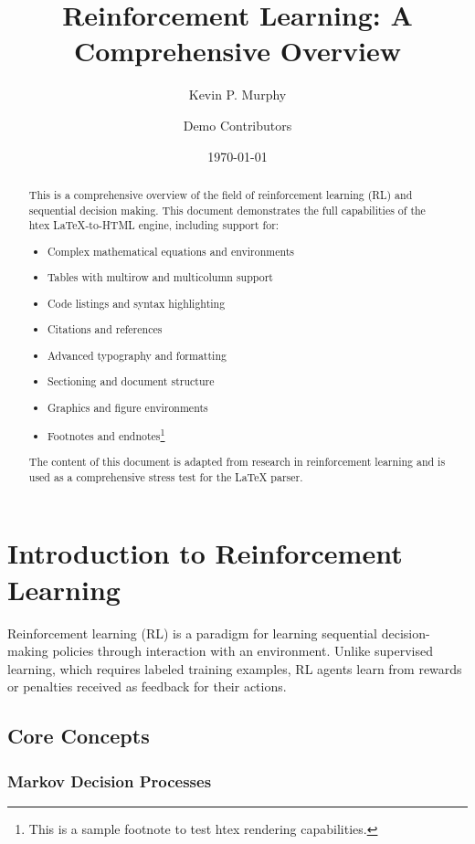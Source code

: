 \documentclass[10pt]{article}
\title{Reinforcement Learning: A Comprehensive Overview}
\author{Kevin P. Murphy \and Demo Contributors}
\date{\today}
\begin{document}
\maketitle

\begin{abstract}
This is a comprehensive overview of the field of reinforcement learning (RL) and sequential decision making. This document demonstrates the full capabilities of the htex LaTeX-to-HTML engine, including support for:
\begin{itemize}
    \item Complex mathematical equations and environments
    \item Tables with multirow and multicolumn support
    \item Code listings and syntax highlighting
    \item Citations and references
    \item Advanced typography and formatting
    \item Sectioning and document structure
    \item Graphics and figure environments
    \item Footnotes and endnotes\footnote{This is a sample footnote to test htex rendering capabilities.}
\end{itemize}

The content of this document is adapted from research in reinforcement learning and is used as a comprehensive stress test for the LaTeX parser.
\end{abstract}

\tableofcontents
\newpage

\section{Introduction to Reinforcement Learning}

Reinforcement learning (RL) is a paradigm for learning sequential decision-making policies through interaction with an environment. Unlike supervised learning, which requires labeled training examples, RL agents learn from rewards or penalties received as feedback for their actions.

\subsection{Core Concepts}

\subsubsection{Markov Decision Processes}
\end{document}
